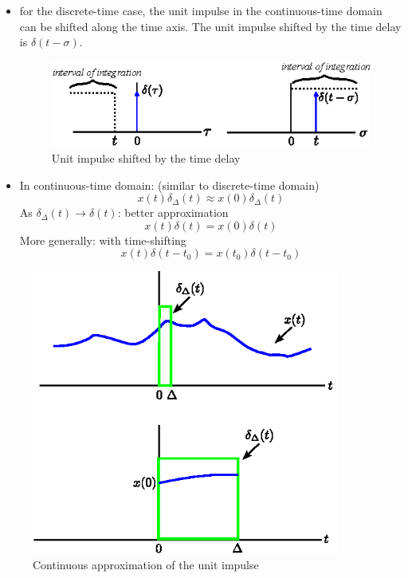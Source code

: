 \begin{itemize}
    \item for the discrete-time case, the unit impulse in the continuous-time domain can be shifted along the time axis. The unit impulse shifted by the time delay is $\delta(t-\sigma)$.
    
    \begin{figure}[H] 
        \centering
        \includegraphics[width=.8\textwidth]{images/unit_step_shift.eps}
        \caption{Unit impulse shifted by the time delay}
        \label{fig:unit_step_shift}
    \end{figure} 
\end{itemize}

 \begin{minipage}{0.5\textwidth}
 \begin{itemize}
\item In continuous-time domain: (similar to discrete-time domain)
\[ x(t)\delta_{\Delta}(t) \approx x(0)\delta_{\Delta}(t) \]
As $\delta_{\Delta}(t)\rightarrow \delta(t)$: better approximation
\[ x(t)\delta(t) = x(0)\delta(t) \]
More generally: with time-shifting
\[ x(t)\delta(t-t_{0}) = x(t_{0})\delta(t-t_{0}) \] 
\end{itemize}
\end{minipage}\hfill
\begin{minipage}{0.5\textwidth} 
    \begin{figure}[H]
    \centering 
    \includegraphics[width=0.9\textwidth]{images/unit_step_continuous_shift.eps}
    \caption{Continuous approximation of the unit impulse} 
\end{figure}
\end{minipage}
 
